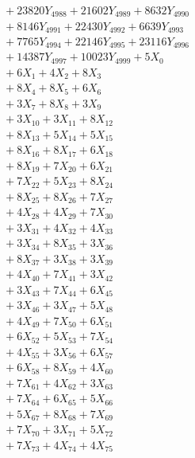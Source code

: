 \documentclass[a4paper,10pt]{article}
\begin{document}
{\begin{align}
&\;  + 23820 Y_{4988} + 21602 Y_{4989} + 8632 Y_{4990} \\[0.3ex]
&\;  + 8146 Y_{4991} + 22430 Y_{4992} + 6639 Y_{4993} \\[0.3ex]
&\;  + 7765 Y_{4994} + 22146 Y_{4995} + 23116 Y_{4996} \\[0.3ex]
&\;  + 14387 Y_{4997} + 10023 Y_{4999} + 5 X_{0} \\[0.3ex]
&\;  + 6 X_{1} + 4 X_{2} + 8 X_{3} \\[0.3ex]
&\;  + 8 X_{4} + 8 X_{5} + 6 X_{6} \\[0.3ex]
&\;  + 3 X_{7} + 8 X_{8} + 3 X_{9} \\[0.5ex]\allowbreak
&\;  + 3 X_{10} + 3 X_{11} + 8 X_{12} \\[0.3ex]
&\;  + 8 X_{13} + 5 X_{14} + 5 X_{15} \\[0.3ex]
&\;  + 8 X_{16} + 8 X_{17} + 6 X_{18} \\[0.3ex]
&\;  + 8 X_{19} + 7 X_{20} + 6 X_{21} \\[0.3ex]
&\;  + 7 X_{22} + 5 X_{23} + 8 X_{24} \\[0.3ex]
&\;  + 8 X_{25} + 8 X_{26} + 7 X_{27} \\[0.3ex]
&\;  + 4 X_{28} + 4 X_{29} + 7 X_{30} \\[0.3ex]
&\;  + 3 X_{31} + 4 X_{32} + 4 X_{33} \\[0.3ex]
&\;  + 3 X_{34} + 8 X_{35} + 3 X_{36} \\[0.3ex]
&\;  + 8 X_{37} + 3 X_{38} + 3 X_{39} \\[0.5ex]\allowbreak
&\;  + 4 X_{40} + 7 X_{41} + 3 X_{42} \\[0.3ex]
&\;  + 3 X_{43} + 7 X_{44} + 6 X_{45} \\[0.3ex]
&\;  + 3 X_{46} + 3 X_{47} + 5 X_{48} \\[0.3ex]
&\;  + 4 X_{49} + 7 X_{50} + 6 X_{51} \\[0.3ex]
&\;  + 6 X_{52} + 5 X_{53} + 7 X_{54} \\[0.3ex]
&\;  + 4 X_{55} + 3 X_{56} + 6 X_{57} \\[0.3ex]
&\;  + 6 X_{58} + 8 X_{59} + 4 X_{60} \\[0.3ex]
&\;  + 7 X_{61} + 4 X_{62} + 3 X_{63} \\[0.3ex]
&\;  + 7 X_{64} + 6 X_{65} + 5 X_{66} \\[0.3ex]
&\;  + 5 X_{67} + 8 X_{68} + 7 X_{69} \\[0.5ex]\allowbreak
&\;  + 7 X_{70} + 3 X_{71} + 5 X_{72} \\[0.3ex]
&\;  + 7 X_{73} + 4 X_{74} + 4 X_{75} \\[0.3ex]

\end{align}}
\end{document}
